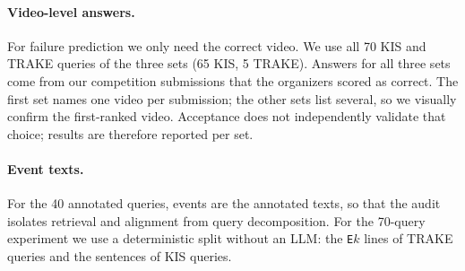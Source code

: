 \paragraph{Video-level answers.}
For failure prediction we only need the correct video.
We use all 70 KIS and TRAKE queries of the three sets (65 KIS, 5 TRAKE).
Answers for all three sets come from our competition submissions that the organizers scored as correct.
The first set names one video per submission; the other sets list several, so we visually confirm the first-ranked video.
Acceptance does not independently validate that choice; results are therefore reported per set.

\paragraph{Event texts.}
For the 40 annotated queries, events are the annotated texts, so that the audit isolates retrieval and alignment from query decomposition.
For the 70-query experiment we use a deterministic split without an LLM: the \texttt{E}$k$ lines of TRAKE queries and the sentences of KIS queries.
